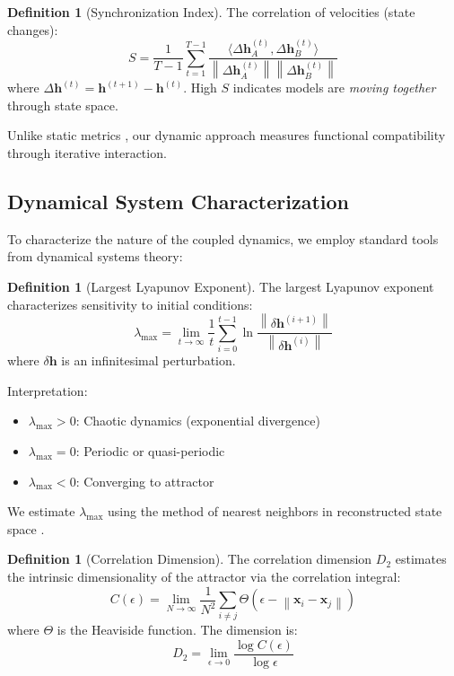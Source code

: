\documentclass[10pt]{article} %
\theoremstyle{plain}
\theoremstyle{definition}
\newtheorem{definition}[theorem]{Definition}
\theoremstyle{remark}
\renewcommand{\norm}[1]{\left\lVert#1\right\rVert}
\newcommand{\inner}[2]{\langle #1, #2 \rangle}
\renewcommand{\vect}[1]{\bm{#1}}
\begin{document}
\begin{definition}[Synchronization Index]
The correlation of velocities (state changes):
\begin{equation}
    S = \frac{1}{T-1} \sum_{t=1}^{T-1} \frac{\inner{\Delta\vect{h}_A^{(t)}}{\Delta\vect{h}_B^{(t)}}}{\norm{\Delta\vect{h}_A^{(t)}} \norm{\Delta\vect{h}_B^{(t)}}}
\end{equation}
where $\Delta\vect{h}^{(t)} = \vect{h}^{(t+1)} - \vect{h}^{(t)}$. High $S$ indicates models are \textit{moving together} through state space.
\end{definition}

Unlike static metrics \cite{ding2021grounding}, our dynamic approach measures functional compatibility through iterative interaction.

\subsection{Dynamical System Characterization}

To characterize the nature of the coupled dynamics, we employ standard tools from dynamical systems theory:

\begin{definition}[Largest Lyapunov Exponent]
The largest Lyapunov exponent characterizes sensitivity to initial conditions:
\begin{equation}
    \lambda_{\max} = \lim_{t \to \infty} \frac{1}{t} \sum_{i=0}^{t-1} \ln \frac{\norm{\delta\vect{h}^{(i+1)}}}{\norm{\delta\vect{h}^{(i)}}}
\end{equation}
where $\delta\vect{h}$ is an infinitesimal perturbation.

Interpretation:
\begin{itemize}
    \item $\lambda_{\max} > 0$: Chaotic dynamics (exponential divergence)
    \item $\lambda_{\max} = 0$: Periodic or quasi-periodic
    \item $\lambda_{\max} < 0$: Converging to attractor
\end{itemize}
\end{definition}

We estimate $\lambda_{\max}$ using the method of nearest neighbors in reconstructed state space \cite{wolf1985}.

\begin{definition}[Correlation Dimension]
The correlation dimension $D_2$ estimates the intrinsic dimensionality of the attractor via the correlation integral:
\begin{equation}
    C(\epsilon) = \lim_{N \to \infty} \frac{1}{N^2} \sum_{i \neq j} \Theta(\epsilon - \norm{\vect{x}_i - \vect{x}_j})
\end{equation}
where $\Theta$ is the Heaviside function. The dimension is:
\begin{equation}
    D_2 = \lim_{\epsilon \to 0} \frac{\log C(\epsilon)}{\log \epsilon}
\end{equation}
\end{definition}
\end{document}
